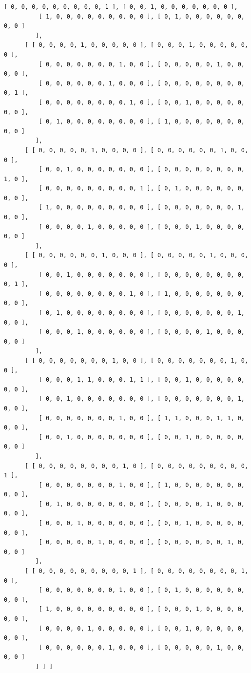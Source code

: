 \documentclass[a4paper, 10pt]{book}
\theoremstyle{definition}
\numberwithin{equation}{chapter}
\begin{document}
\begin{appendices}
\begin{enumerate}
\begin{lstlisting}[numbers=none]
          [ 0, 0, 0, 0, 0, 0, 0, 0, 0, 1 ], [ 0, 0, 1, 0, 0, 0, 0, 0, 0, 0 ],
          [ 1, 0, 0, 0, 0, 0, 0, 0, 0, 0 ], [ 0, 1, 0, 0, 0, 0, 0, 0, 0, 0 ] 
         ], 
      [ [ 0, 0, 0, 0, 1, 0, 0, 0, 0, 0 ], [ 0, 0, 0, 1, 0, 0, 0, 0, 0, 0 ], 
          [ 0, 0, 0, 0, 0, 0, 0, 1, 0, 0 ], [ 0, 0, 0, 0, 0, 1, 0, 0, 0, 0 ],
          [ 0, 0, 0, 0, 0, 0, 1, 0, 0, 0 ], [ 0, 0, 0, 0, 0, 0, 0, 0, 0, 1 ],
          [ 0, 0, 0, 0, 0, 0, 0, 0, 1, 0 ], [ 0, 0, 1, 0, 0, 0, 0, 0, 0, 0 ],
          [ 0, 1, 0, 0, 0, 0, 0, 0, 0, 0 ], [ 1, 0, 0, 0, 0, 0, 0, 0, 0, 0 ] 
         ], 
      [ [ 0, 0, 0, 0, 0, 1, 0, 0, 0, 0 ], [ 0, 0, 0, 0, 0, 0, 1, 0, 0, 0 ], 
          [ 0, 0, 1, 0, 0, 0, 0, 0, 0, 0 ], [ 0, 0, 0, 0, 0, 0, 0, 0, 1, 0 ],
          [ 0, 0, 0, 0, 0, 0, 0, 0, 0, 1 ], [ 0, 1, 0, 0, 0, 0, 0, 0, 0, 0 ],
          [ 1, 0, 0, 0, 0, 0, 0, 0, 0, 0 ], [ 0, 0, 0, 0, 0, 0, 0, 1, 0, 0 ],
          [ 0, 0, 0, 0, 1, 0, 0, 0, 0, 0 ], [ 0, 0, 0, 1, 0, 0, 0, 0, 0, 0 ] 
         ], 
      [ [ 0, 0, 0, 0, 0, 0, 1, 0, 0, 0 ], [ 0, 0, 0, 0, 0, 1, 0, 0, 0, 0 ], 
          [ 0, 0, 1, 0, 0, 0, 0, 0, 0, 0 ], [ 0, 0, 0, 0, 0, 0, 0, 0, 0, 1 ],
          [ 0, 0, 0, 0, 0, 0, 0, 0, 1, 0 ], [ 1, 0, 0, 0, 0, 0, 0, 0, 0, 0 ],
          [ 0, 1, 0, 0, 0, 0, 0, 0, 0, 0 ], [ 0, 0, 0, 0, 0, 0, 0, 1, 0, 0 ],
          [ 0, 0, 0, 1, 0, 0, 0, 0, 0, 0 ], [ 0, 0, 0, 0, 1, 0, 0, 0, 0, 0 ] 
         ], 
      [ [ 0, 0, 0, 0, 0, 0, 0, 1, 0, 0 ], [ 0, 0, 0, 0, 0, 0, 0, 1, 0, 0 ], 
          [ 0, 0, 0, 1, 1, 0, 0, 0, 1, 1 ], [ 0, 0, 1, 0, 0, 0, 0, 0, 0, 0 ],
          [ 0, 0, 1, 0, 0, 0, 0, 0, 0, 0 ], [ 0, 0, 0, 0, 0, 0, 0, 1, 0, 0 ],
          [ 0, 0, 0, 0, 0, 0, 0, 1, 0, 0 ], [ 1, 1, 0, 0, 0, 1, 1, 0, 0, 0 ],
          [ 0, 0, 1, 0, 0, 0, 0, 0, 0, 0 ], [ 0, 0, 1, 0, 0, 0, 0, 0, 0, 0 ] 
         ], 
      [ [ 0, 0, 0, 0, 0, 0, 0, 0, 1, 0 ], [ 0, 0, 0, 0, 0, 0, 0, 0, 0, 1 ], 
          [ 0, 0, 0, 0, 0, 0, 0, 1, 0, 0 ], [ 1, 0, 0, 0, 0, 0, 0, 0, 0, 0 ],
          [ 0, 1, 0, 0, 0, 0, 0, 0, 0, 0 ], [ 0, 0, 0, 0, 1, 0, 0, 0, 0, 0 ],
          [ 0, 0, 0, 1, 0, 0, 0, 0, 0, 0 ], [ 0, 0, 1, 0, 0, 0, 0, 0, 0, 0 ],
          [ 0, 0, 0, 0, 0, 1, 0, 0, 0, 0 ], [ 0, 0, 0, 0, 0, 0, 1, 0, 0, 0 ] 
         ], 
      [ [ 0, 0, 0, 0, 0, 0, 0, 0, 0, 1 ], [ 0, 0, 0, 0, 0, 0, 0, 0, 1, 0 ], 
          [ 0, 0, 0, 0, 0, 0, 0, 1, 0, 0 ], [ 0, 1, 0, 0, 0, 0, 0, 0, 0, 0 ],
          [ 1, 0, 0, 0, 0, 0, 0, 0, 0, 0 ], [ 0, 0, 0, 1, 0, 0, 0, 0, 0, 0 ],
          [ 0, 0, 0, 0, 1, 0, 0, 0, 0, 0 ], [ 0, 0, 1, 0, 0, 0, 0, 0, 0, 0 ],
          [ 0, 0, 0, 0, 0, 0, 1, 0, 0, 0 ], [ 0, 0, 0, 0, 0, 1, 0, 0, 0, 0 ] 
         ] ] ]
	\end{lstlisting}

\end{enumerate}
\end{appendices}
\end{document}
